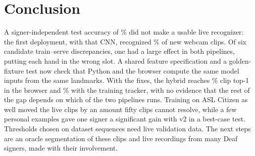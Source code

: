 \section{Conclusion}
\label{sec:conclusion}

A signer-independent test accuracy of \% did not make a usable live recognizer: the
first deployment, with that CNN, recognized \% of new webcam clips. Of
six candidate train--serve discrepancies, one had a large effect in both pipelines, putting each
hand in the wrong slot. A shared feature specification and a golden-fixture test now check that
Python and the browser compute the same model inputs from the same landmarks. With the fixes, the
hybrid reaches \% clip top-1 in the browser and \%
with the training tracker, with no evidence that the rest of the gap depends on which of the two
pipelines runs. Training on ASL Citizen
as well moved the live clips by an amount fifty clips cannot resolve, while a few personal examples
gave one signer a significant gain with v2 in a best-case test. Thresholds chosen on dataset
sequences need live validation data. The next steps are an oracle segmentation of these clips and
live recordings from many Deaf signers, made with their involvement.

